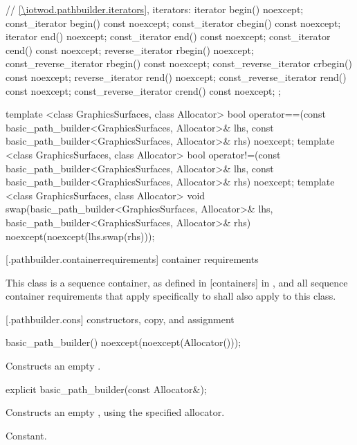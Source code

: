 \begin{codeblock}
{{    // \ref{\iotwod.pathbuilder.iterators}, iterators:
    iterator begin() noexcept;
    const_iterator begin() const noexcept;
    const_iterator cbegin() const noexcept;
    iterator end() noexcept;
    const_iterator end() const noexcept;
    const_iterator cend() const noexcept;
    reverse_iterator rbegin() noexcept;
    const_reverse_iterator rbegin() const noexcept;
    const_reverse_iterator crbegin() const noexcept;
    reverse_iterator rend() noexcept;
    const_reverse_iterator rend() const noexcept;
    const_reverse_iterator crend() const noexcept;
  };

  template <class GraphicsSurfaces, class Allocator>
  bool operator==(const basic_path_builder<GraphicsSurfaces, Allocator>& lhs,
    const basic_path_builder<GraphicsSurfaces, Allocator>& rhs) noexcept;
  template <class GraphicsSurfaces, class Allocator>
  bool operator!=(const basic_path_builder<GraphicsSurfaces, Allocator>& lhs,
    const basic_path_builder<GraphicsSurfaces, Allocator>& rhs) noexcept;
  template <class GraphicsSurfaces, class Allocator>
  void swap(basic_path_builder<GraphicsSurfaces, Allocator>& lhs,
    basic_path_builder<GraphicsSurfaces, Allocator>& rhs) noexcept(noexcept(lhs.swap(rhs)));
}
\end{codeblock}

 [\iotwod.pathbuilder.containerrequirements] { container requirements}

\pnum
This class is a sequence container, as defined in [containers] in \cppseventeen, and all sequence container requirements that apply specifically to  shall also apply to this class.

 [\iotwod.pathbuilder.cons] { constructors, copy, and assignment}

%
\begin{itemdecl}
basic_path_builder() noexcept(noexcept(Allocator()));
\end{itemdecl}
\begin{itemdescr}
\pnum
\effects
Constructs an empty .
\end{itemdescr}
	
%
\begin{itemdecl}
explicit basic_path_builder(const Allocator&);
\end{itemdecl}
\begin{itemdescr}
\pnum
\effects
Constructs an empty , using the specified allocator.

\pnum
\complexity
Constant.
\end{itemdescr}


